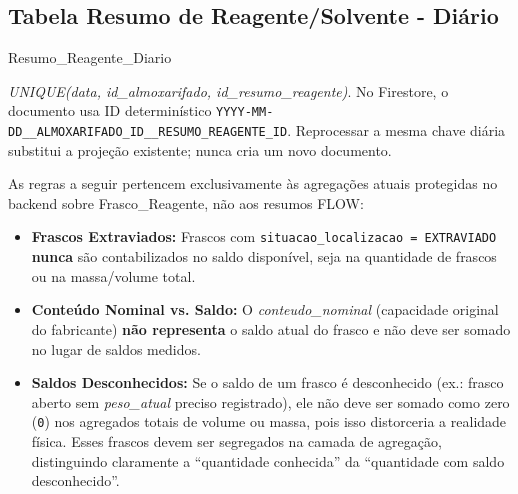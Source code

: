 \subsection{Tabela Resumo de Reagente/Solvente - Diário}
\begin{entidade}{Resumo\_Reagente\_Diario}
\end{entidade}
\begin{regra}
\textit{UNIQUE(data, id\_almoxarifado, id\_resumo\_reagente)}. No Firestore, o documento usa ID determinístico \texttt{YYYY-MM-DD\_\_ALMOXARIFADO\_ID\_\_RESUMO\_REAGENTE\_ID}. Reprocessar a mesma chave diária substitui a projeção existente; nunca cria um novo documento.
\end{regra}

\begin{explicacao}
As regras a seguir pertencem exclusivamente às agregações atuais protegidas no backend sobre Frasco\_Reagente, não aos resumos FLOW:
\begin{itemize}
    \item \textbf{Frascos Extraviados:} Frascos com \texttt{situacao\_localizacao = EXTRAVIADO} \textbf{nunca} são contabilizados no saldo disponível, seja na quantidade de frascos ou na massa/volume total.
    \item \textbf{Conteúdo Nominal vs. Saldo:} O \textit{conteudo\_nominal} (capacidade original do fabricante) \textbf{não representa} o saldo atual do frasco e não deve ser somado no lugar de saldos medidos.
    \item \textbf{Saldos Desconhecidos:} Se o saldo de um frasco é desconhecido (ex.: frasco aberto sem \textit{peso\_atual} preciso registrado), ele não deve ser somado como zero (\texttt{0}) nos agregados totais de volume ou massa, pois isso distorceria a realidade física. Esses frascos devem ser segregados na camada de agregação, distinguindo claramente a ``quantidade conhecida'' da ``quantidade com saldo desconhecido''.
\end{itemize}
\end{explicacao}

